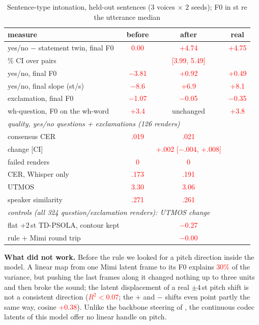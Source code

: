 \documentclass[conference]{IEEEtran}
\newcommand{\RES}[1]{\textcolor{red}{#1}}
\begin{document}
\begin{table}[t]
\caption{Sentence-type intonation, held-out sentences (3 voices $\times$ 2 seeds); F0 in st re the
utterance median}\label{tab:into}
\centering
\setlength{\tabcolsep}{3pt}
\begin{tabular}{lccc}
\toprule
measure & before & after & real \\
\midrule
yes/no $-$ statement twin, final F0 & \RES{0.00} & \RES{+4.74} & \RES{+4.75} \\
\quad 95\% CI over pairs & & \RES{[3.99, 5.49]} & \\
yes/no, final F0 & \RES{$-$3.81} & \RES{+0.92} & \RES{+0.49} \\
yes/no, final slope (st/s) & \RES{$-$8.6} & \RES{+6.9} & \RES{+8.1} \\
exclamation, final F0 & \RES{$-$1.07} & \RES{$-$0.05} & \RES{$-$0.35} \\
wh-question, F0 on the wh-word & \RES{+3.4} & unchanged & \RES{+3.8} \\
\midrule
\multicolumn{4}{l}{\emph{quality, yes/no questions + exclamations (126 renders)}} \\
consensus CER & \RES{.019} & \RES{.021} & \\
\quad change [CI] & & \RES{+.002 [$-$.004, +.008]} & \\
failed renders & \RES{0} & \RES{0} & \\
CER, Whisper only & \RES{.173} & \RES{.191} & \\
UTMOS & \RES{3.30} & \RES{3.06} & \\
speaker similarity & \RES{.271} & \RES{.261} & \\
\multicolumn{4}{l}{\emph{controls (all 324 question/exclamation renders): UTMOS change}} \\
flat +2\,st TD-PSOLA, contour kept & & \RES{$-$0.27} & \\
rule + Mimi round trip & & \RES{$-$0.00} & \\
\bottomrule
\end{tabular}
\end{table}

\textbf{What did not work.} Before the rule we looked for a pitch direction inside the model. A linear
map from one Mimi latent frame to its F0 explains \RES{30\%} of the variance, but pushing the last frames
along it changed nothing up to three units and then broke the sound; the latent displacement of a real
$\pm$4\,st pitch shift is not a consistent direction (\RES{$R^2<0.07$}; the $+$ and $-$ shifts even point
partly the same way, cosine \RES{+0.38}). Unlike the backbone steering of \cite{vigneaux2026tunes}, the
continuous codec latents of this model offer no linear handle on pitch.
\end{document}

